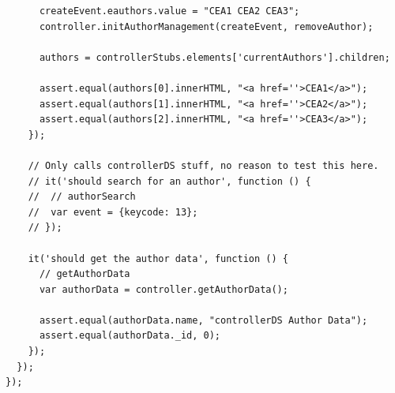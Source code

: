 \documentclass[12pt]{ucthesis}
\begin{document}
\begin{lstlisting}
      createEvent.eauthors.value = "CEA1 CEA2 CEA3";
      controller.initAuthorManagement(createEvent, removeAuthor);

      authors = controllerStubs.elements['currentAuthors'].children;

      assert.equal(authors[0].innerHTML, "<a href=''>CEA1</a>");
      assert.equal(authors[1].innerHTML, "<a href=''>CEA2</a>");
      assert.equal(authors[2].innerHTML, "<a href=''>CEA3</a>");
    });

    // Only calls controllerDS stuff, no reason to test this here.
    // it('should search for an author', function () {
    //  // authorSearch
    //  var event = {keycode: 13};
    // });

    it('should get the author data', function () {
      // getAuthorData
      var authorData = controller.getAuthorData();

      assert.equal(authorData.name, "controllerDS Author Data");
      assert.equal(authorData._id, 0);
    });
  });
});
\end{lstlisting}
\end{document}
